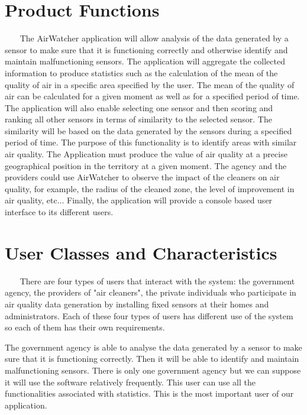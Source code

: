 \documentclass{report}
\begin{document}
\section{Product Functions} ~~~
The AirWatcher application will allow analysis of the data generated by a sensor
to make sure that it is functioning correctly and otherwise identify and maintain
malfunctioning sensors. The application will aggregate the collected information
to produce statistics such as the calculation of the mean of the quality of air
in a specific area specified by the user. The mean of the quality of air can be
calculated for a given moment as well as for a specified period of time. The
application will also enable selecting one sensor and then scoring and ranking
all other sensors in terms of similarity to the selected sensor. The similarity
will be based on the data generated by the sensors during a specified period of
time. The purpose of this functionality is to identify areas with similar air
quality. The Application must produce the value of air quality at a precise
geographical position in the territory at a given moment. The agency and the
providers could use AirWatcher to observe the impact of the cleaners on air
quality, for example, the radius of the cleaned zone, the level of improvement
in air quality, etc... Finally, the application will provide a console based
user interface to its different users.


\section{User Classes and Characteristics} ~~~
There are four types of users that interact with the system: the government
agency, the providers of "air cleaners", the private individuals who participate
in air quality data generation by installing fixed sensors at their homes and
administrators. Each of these four types of users has different use of the
system so each of them has their own requirements.

The government agency is able to analyse the data generated by a sensor to
make sure that it is functioning correctly. Then it will be able to identify
and maintain malfunctioning sensors. There is only one government agency but we
can suppose it will use the software relatively frequently. This user can use
all the functionalities associated with statistics. This is the most important
user of our application.
\end{document}
